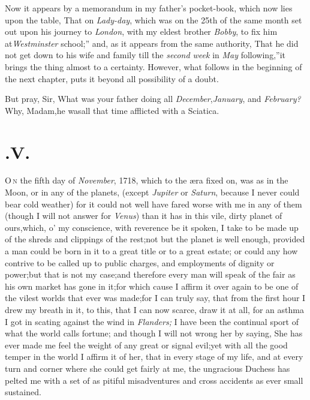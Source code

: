 \documentclass{article}
\begin{document}
Now it appears by a memorandum in my father’s pocket-book, which now lies upon
the table, \lqq That on \textit{Lady-day}, which was on the 25th of
the same month 
set out upon his journey to \textit{London}, with my eldest brother
\textit{Bobby}, to fix him at\break\textit{Westminster} school;” and,
as it appears from the same authority, \lqq That he did not get
down to his wife and family till the \textit{second week} in
\textit{May} following,”\tsk  it brings the thing almost to a
certainty.\break
However, what follows in the beginning of the next
chapter, puts it beyond all possibility of a doubt.

\tsh  But pray, Sir, What was your father doing
all \textit{December},\tsk\textit{January}, and
\textit{February?}\tsh  Why, Madam,\tsk  he was\break all that
time afflicted with a Sciatica.
\hfill{}

\section{.\enspace V.}

\lettrine{O}{\,n} the fifth day of \textit{November},
1718, which to the æra fixed on, was as\break 
{}
\break
{}
in the Moon, or in any of the
planets, (except \textit{Jupiter} or \textit{Saturn}, because I never
could bear cold weather) for it could not well have fared worse
with me in any of them (though I will not answer for \textit{Venus})
than it has in this vile, dirty planet of ours,\tsk  which,
o’ my conscience, with reverence be it spoken, I take to be
made up of the shreds and clippings of the rest;\tsh  not
but the planet is well enough, provided a man could be born in it
to a great title or to a great estate; or could any how contrive to
be called up to public charges, and employments of dignity or
power;\tsh  but that is not my case;\tsh  and
therefore every man will speak of the fair as his own market has
gone in it;\tsk  for which cause I affirm it over
again to be one of the vilest worlds that ever was made;\tsk  for
I can truly say, that from the first hour I drew my breath in it,
to this, that I can now scarce, draw it at all, for an asthma I got
in scating against the wind in \textit{Flanders;}\tsk\break
I have been the continual sport of what the world calls fortune; and though I will
not wrong her by saying, She has ever made me feel the weight of any great or signal
evil;\tsk  yet with all the good temper in the world I affirm it of her, that in
every stage of my life, and at every turn and corner where she could get fairly
at me, the ungracious Duchess has pelted me with a set of as pitiful misadventures
and cross accidents as ever small  sustained.
\end{document}
